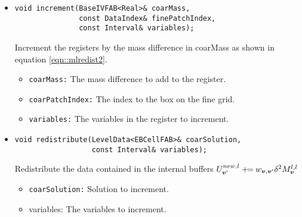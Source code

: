 \begin{itemize}
\item \begin{small}\begin{verbatim}
void increment(BaseIVFAB<Real>& coarMass,
               const DataIndex& finePatchIndex,
               const Interval& variables);
\end{verbatim}\end{small}
Increment the registers by the mass difference
in coarMass as shown in equation \ref{eqn::mlredist2}.
\begin{itemize}
\item \verb/coarMass:/  The mass difference to add to the register.
\item \verb/coarPatchIndex:/ The index to the box on the fine grid. 
\item \verb/variables:/ The variables in the register to increment.
\end{itemize}

\item \begin{small}\begin{verbatim}
void redistribute(LevelData<EBCellFAB>& coarSolution,
                  const Interval& variables);
\end{verbatim}\end{small}
Redistribute the data contained in the internal buffers
$U^{new,l}_{{\boldsymbol{v}}'} \mathbin{+\mkern-7mu=} w_{{\boldsymbol{v}},{\boldsymbol{v}}'}
\delta^2 M^{l, l}_{\boldsymbol{v}} $
\begin{itemize}
\item {\tt coarSolution:} Solution to increment.
\item {variables:}  The variables to increment. 
\end{itemize}
\end{itemize}

